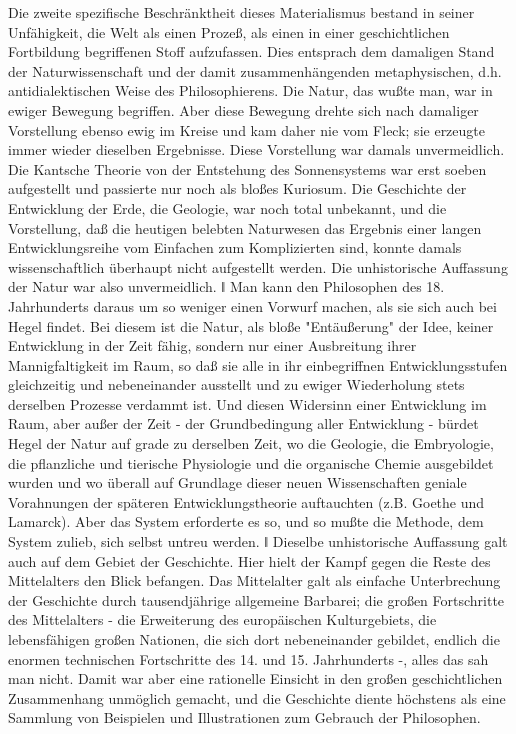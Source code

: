 Die zweite spezifische Beschränktheit dieses Materialismus
bestand in seiner Unfähigkeit, die Welt als einen Prozeß, als einen in
einer geschichtlichen Fortbildung begriffenen Stoff aufzufassen. Dies
entsprach dem damaligen Stand der Naturwissenschaft und der damit
zusammenhängenden metaphysischen, d.h. antidialektischen Weise des
Philosophierens. Die Natur, das wußte man, war in ewiger Bewegung
begriffen. Aber diese Bewegung drehte sich nach damaliger Vorstellung
ebenso ewig im Kreise und kam daher nie vom Fleck; sie erzeugte immer
wieder dieselben Ergebnisse. Diese Vorstellung war damals unvermeidlich.
Die Kantsche Theorie von der Entstehung des Sonnensystems war erst
soeben aufgestellt und passierte nur noch als bloßes Kuriosum. Die
Geschichte der Entwicklung der Erde, die Geologie, war noch total
unbekannt, und die Vorstellung, daß die heutigen belebten Naturwesen das
Ergebnis einer langen Entwicklungsreihe vom Einfachen zum Komplizierten
sind, konnte damals wissenschaftlich überhaupt nicht aufgestellt werden.
Die unhistorische Auffassung der Natur war also unvermeidlich. ǁ Man
kann den Philosophen des 18. Jahrhunderts daraus um so weniger einen
Vorwurf machen, als sie sich auch bei Hegel findet. Bei diesem ist die
Natur, als bloße "Entäußerung" der Idee, keiner Entwicklung in der Zeit
fähig, sondern nur einer Ausbreitung ihrer Mannigfaltigkeit im Raum, so
daß sie alle in ihr einbegriffnen Entwicklungsstufen gleichzeitig und
nebeneinander ausstellt und zu ewiger Wiederholung stets derselben
Prozesse verdammt ist. Und diesen Widersinn einer Entwicklung im Raum,
aber außer der Zeit - der Grundbedingung aller Entwicklung - bürdet
Hegel der Natur auf grade zu derselben Zeit, wo die Geologie, die
Embryologie, die pflanzliche und tierische Physiologie und die
organische Chemie ausgebildet wurden und wo überall auf Grundlage dieser
neuen Wissenschaften geniale Vorahnungen der späteren
Entwicklungstheorie auftauchten (z.B. Goethe und Lamarck). Aber das
System erforderte es so, und so mußte die Methode, dem System zulieb,
sich selbst untreu werden. ǁ Dieselbe unhistorische Auffassung galt auch
auf dem Gebiet der Geschichte. Hier hielt der Kampf gegen die Reste des
Mittelalters den Blick befangen. Das Mittelalter galt als einfache
Unterbrechung der Geschichte durch tausendjährige allgemeine Barbarei;
die großen Fortschritte des Mittelalters - die Erweiterung des
europäischen Kulturgebiets, die lebensfähigen großen Nationen, die sich
dort nebeneinander gebildet, endlich die enormen technischen
Fortschritte des 14. und 15. Jahrhunderts -, alles das sah man nicht.
Damit war aber eine rationelle Einsicht in den großen geschichtlichen
Zusammenhang unmöglich gemacht, und die Geschichte diente höchstens als
eine Sammlung von Beispielen und Illustrationen zum Gebrauch der
Philosophen.

